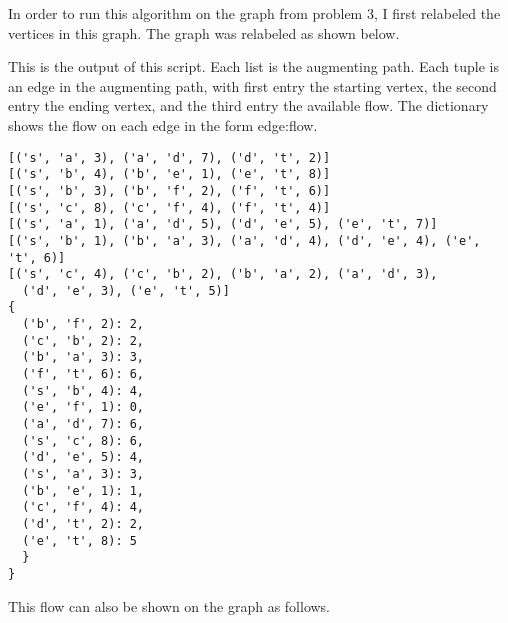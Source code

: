 \documentclass[11pt, oneside]{article}
\begin{document}
\begin{enumerate}
    In order to run this algorithm on the graph from problem 3, I first
    relabeled the vertices in this graph.
    The graph was relabeled as shown below.
    \begin{center}
    \end{center}
    
    This is the output of this script.
    Each list is the augmenting path.
    Each tuple is an edge in the augmenting path, with first entry the starting
    vertex, the second entry the ending vertex, and the third entry the
    available flow.
    The dictionary shows the flow on each edge in the form edge:flow.
    \begin{verbatim}
[('s', 'a', 3), ('a', 'd', 7), ('d', 't', 2)]
[('s', 'b', 4), ('b', 'e', 1), ('e', 't', 8)]
[('s', 'b', 3), ('b', 'f', 2), ('f', 't', 6)]
[('s', 'c', 8), ('c', 'f', 4), ('f', 't', 4)]
[('s', 'a', 1), ('a', 'd', 5), ('d', 'e', 5), ('e', 't', 7)]
[('s', 'b', 1), ('b', 'a', 3), ('a', 'd', 4), ('d', 'e', 4), ('e', 't', 6)]
[('s', 'c', 4), ('c', 'b', 2), ('b', 'a', 2), ('a', 'd', 3),
  ('d', 'e', 3), ('e', 't', 5)]
{
  ('b', 'f', 2): 2,
  ('c', 'b', 2): 2,
  ('b', 'a', 3): 3,
  ('f', 't', 6): 6,
  ('s', 'b', 4): 4,
  ('e', 'f', 1): 0,
  ('a', 'd', 7): 6,
  ('s', 'c', 8): 6,
  ('d', 'e', 5): 4,
  ('s', 'a', 3): 3,
  ('b', 'e', 1): 1,
  ('c', 'f', 4): 4,
  ('d', 't', 2): 2,
  ('e', 't', 8): 5
  }
}
    \end{verbatim}
    This flow can also be shown on the graph as follows.
    \begin{center}
\end{center}
\end{enumerate}
\end{document}
